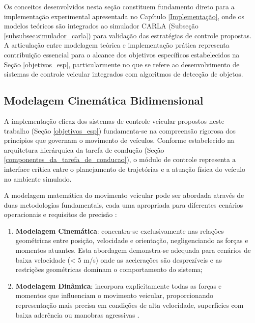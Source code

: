 Os conceitos desenvolvidos nesta seção constituem fundamento direto para a implementação experimental apresentada no Capítulo \ref{Implementação}, onde os modelos teóricos são integrados ao simulador CARLA (Subseção \ref{subsubsec:simulador_carla}) para validação das estratégias de controle propostas. A articulação entre modelagem teórica e implementação prática representa contribuição essencial para o alcance dos objetivos específicos estabelecidos na Seção \ref{objetivos_esp}, particularmente no que se refere ao desenvolvimento de sistemas de controle veicular integrados com algoritmos de detecção de objetos.



\subsection{Modelagem Cinemática Bidimensional} \label{modelagem_2D}

A implementação eficaz dos sistemas de controle veicular propostos neste trabalho (Seção \ref{objetivos_esp}) fundamenta-se na compreensão rigorosa dos princípios que governam o movimento de veículos. Conforme estabelecido na arquitetura hierárquica da tarefa de condução (Seção \ref{componentes_da_tarefa_de_conducao}), o módulo de controle representa a interface crítica entre o planejamento de trajetórias e a atuação física do veículo no ambiente simulado.

A modelagem matemática do movimento veicular pode ser abordada através de duas metodologias fundamentais, cada uma apropriada para diferentes cenários operacionais e requisitos de precisão \cite{paden2016survey}:

\begin{enumerate}
\item \textbf{Modelagem Cinemática}: concentra-se exclusivamente nas relações geométricas entre posição, velocidade e orientação, negligenciando as forças e momentos atuantes. Esta abordagem demonstra-se adequada para cenários de baixa velocidade (< 5 m/s) onde as acelerações são desprezíveis e as restrições geométricas dominam o comportamento do sistema;

\item \textbf{Modelagem Dinâmica}: incorpora explicitamente todas as forças e momentos que influenciam o movimento veicular, proporcionando representação mais precisa em condições de alta velocidade, superfícies com baixa aderência ou manobras agressivas \cite{jacobson2020vehicle}.
\end{enumerate}


